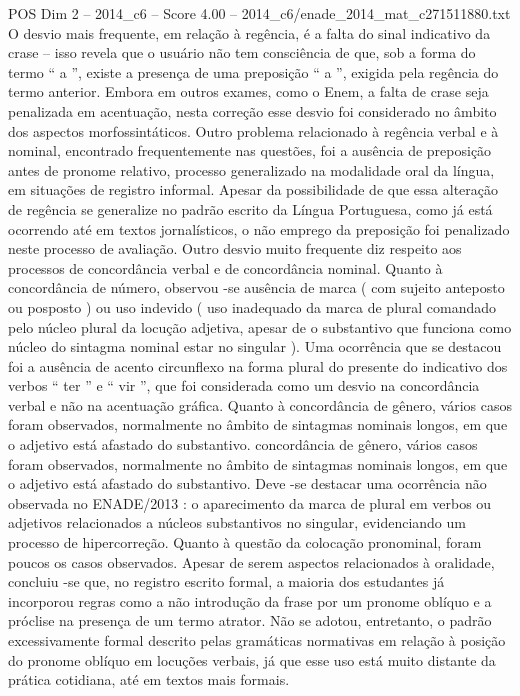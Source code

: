 \begin{textsample}{POS Dim 2 – 2014\_c6 – Score 4.00 – 2014\_c6/enade\_2014\_mat\_c271511880.txt}
O desvio mais frequente, em relação à regência, é a falta do sinal indicativo da crase – isso revela que o usuário não tem consciência de que, sob a forma do termo “ a ”, existe a presença de uma preposição “ a ”, exigida pela regência do termo anterior.
Embora em outros exames, como o Enem, a falta de crase seja penalizada em acentuação, nesta correção esse desvio foi considerado no âmbito dos aspectos morfossintáticos.
Outro problema relacionado à regência verbal e à nominal, encontrado frequentemente nas questões, foi a ausência de preposição antes de pronome relativo, processo generalizado na modalidade oral da língua, em situações de registro informal.
Apesar da possibilidade de que essa alteração de regência se generalize no padrão escrito da Língua Portuguesa, como já está ocorrendo até em textos jornalísticos, o não emprego da preposição foi penalizado neste processo de avaliação.
Outro desvio muito frequente diz respeito aos processos de concordância verbal e de concordância nominal.
Quanto à concordância de número, observou -se ausência de marca ( com sujeito anteposto ou posposto ) ou uso indevido ( uso inadequado da marca de plural comandado pelo núcleo plural da locução adjetiva, apesar de o substantivo que funciona como núcleo do sintagma nominal estar no singular ).
Uma ocorrência que se destacou foi a ausência de acento circunflexo na forma plural do presente do indicativo dos verbos “ ter ” e “ vir ”, que foi considerada como um desvio na concordância verbal e não na acentuação gráfica.
Quanto à concordância de gênero, vários casos foram observados, normalmente no âmbito de sintagmas nominais longos, em que o adjetivo está afastado do substantivo. concordância de gênero, vários casos foram observados, normalmente no âmbito de sintagmas nominais longos, em que o adjetivo está afastado do substantivo.
Deve -se destacar uma ocorrência não observada no ENADE/2013 : o aparecimento da marca de plural em verbos ou adjetivos relacionados a núcleos substantivos no singular, evidenciando um processo de hipercorreção.
Quanto à questão da colocação pronominal, foram poucos os casos observados.
Apesar de serem aspectos relacionados à oralidade, concluiu -se que, no registro escrito formal, a maioria dos estudantes já incorporou regras como a não introdução da frase por um pronome oblíquo e a próclise na presença de um termo atrator.
Não se adotou, entretanto, o padrão excessivamente formal descrito pelas gramáticas normativas em relação à posição do pronome oblíquo em locuções verbais, já que esse uso está muito distante da prática cotidiana, até em textos mais formais.

\end{textsample}
